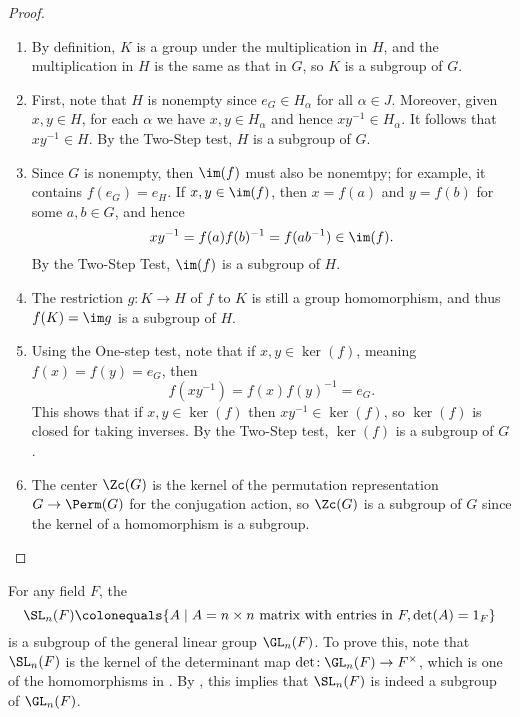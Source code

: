 \begin{proof}$\,$

\vspace{-0.6em}
\begin{enumerate}[itemsep=-0.1em,label=(\alph*)]
	\item By definition, $K$ is a group under the multiplication in $H$, and the multiplication in $H$ is the same as that in $G$, so $K$ is a subgroup of $G$.
	\item First, note that $H$ is nonempty since $e_G \in H_\alpha$ for all $\alpha\in J$. Moreover, given $x,y\in H$, for each $\alpha$ we have $x,y \in H_\alpha$ and hence $xy^{-1} \in H_\alpha$. It follows that $xy^{-1} \in H$. By the Two-Step test, $H$ is a subgroup of $G$. 
	\item Since $G$ is nonempty, then $\im(f)$ must also be nonemtpy; for example, it contains $f(e_G) = e_H$. If $x,y \in \im(f)$, then $x = f(a)$ and $y = f(b)$ for some $a,b \in G$, and hence 
	$$xy^{-1} =f(a)f(b)^{-1} = f(ab^{-1}) \in \im(f).$$
	By the Two-Step Test, $\im(f)$ is a subgroup of $H$. 
	
	\item The restriction $g\!: K \to H$ of $f$ to $K$ is still a group homomorphism, and thus $f(K) = \im g$ is a subgroup of $H$. 
	
	\item Using the One-step test, note that if $x, y \in \ker(f)$, meaning $f(x)=f(y)=e_G$, then 
	$$f(xy^{-1})=f(x)f(y)^{-1}=e_G.$$ 
	This shows that if $x,y\in \ker(f)$ then $xy^{-1}\in \ker(f)$, so $\ker(f)$ is closed for taking inverses. By the Two-Step test, $\ker(f)$ is a subgroup of $G$.
	\item The center $\Zc(G)$ is the kernel of the permutation representation $G\to \Perm(G)$ for the conjugation action, so $\Zc(G)$ is a subgroup of $G$ since the kernel of a homomorphism is a subgroup.\qedhere 
\end{enumerate} 
\end{proof}




\begin{example}
For any field $F$, the 
$$\SL_n(F) \colonequals \{A \mid A = n\times n \text{ matrix with entries in } F, \det(A)=1_F\}$$
is a subgroup of the general linear group $\GL_n(F)$. To prove this, note that $\SL_n(F)$ is the kernel of the determinant map $\det\!:\GL_n(F)\to F^\times$, which is one of the homomorphisms in . By , this implies that $\SL_n(F)$ is indeed a subgroup of $\GL_n(F)$.
\end{example}


